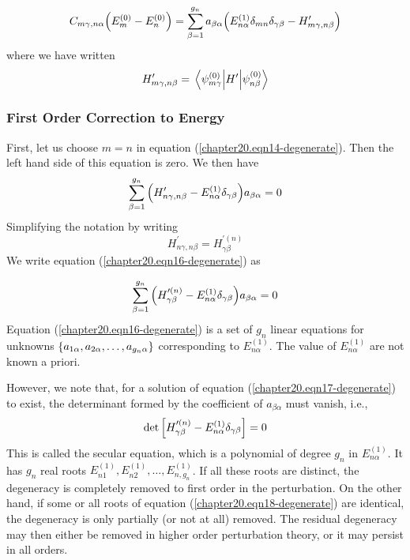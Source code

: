 	\begin{equation}
		C_{m\gamma, n\alpha} \qty(E_m^{(0)} - E_n^{(0)}) = \sum_{\beta=1}^{g_n} a_{\beta\alpha} \qty(E_{n\alpha}^{(1)}\delta_{mn}\delta_{\gamma\beta}  -  H^\prime_{m\gamma,n\beta})
		\label{chapter20.eqn14-degenerate}
	\end{equation}
	where we have written
	\begin{equation}
		H^\prime_{m\gamma,n\beta} = \matrixel{\psi_{m\gamma}^{(0)}} {H^\prime} {\psi_{n\beta}^{(0)}}
		\label{chapter20.eqn15-degenerate}
	\end{equation}
	
	\subsubsection{First Order Correction to Energy}
	
	First, let us choose $m=n$ in equation (\ref{chapter20.eqn14-degenerate}). Then the left hand side of this equation is zero. We then have
	\begin{equation}
		\sum_{\beta=1}^{g_n} \qty(H^\prime_{n\gamma,n \beta}  -  E_{n\alpha}^{(1)}\delta_{\gamma \beta}) a_{\beta \alpha} = 0
		\label{chapter20.eqn16-degenerate}
	\end{equation}
	Simplifying the notation by writing
	\begin{equation}
		H^\prime_{n\gamma, n\beta} = H^{\prime (n)}_{\gamma\beta}
	\end{equation}
	We write equation (\ref{chapter20.eqn16-degenerate}) as
	
	\begin{equation}
		\sum_{\beta=1}^{g_n} \qty(H^{\prime (n)}_{\gamma \beta}  -  E_{n\alpha}^{(1)}\delta_{\gamma \beta}) a_{\beta \alpha} = 0
		\label{chapter20.eqn17-degenerate}
	\end{equation}
	Equation (\ref{chapter20.eqn16-degenerate}) is a set of $g_n$ linear equations for unknowns $\qty{a_{1\alpha}, a_{2\alpha}, \ldots, a_{g_n \alpha}}$ corresponding to $E_{n\alpha}^{(1)}$. The value of $E_{n\alpha}^{(1)}$ are not known a priori.
		
		However, we note that, for a solution of equation (\ref{chapter20.eqn17-degenerate}) to exist, the determinant formed by the coefficient of $a_{\beta\alpha}$ must vanish, i.e.,
		\begin{equation}
			\det \qty[H^{\prime (n)}_{\gamma \beta}  -  E^{(1)}_{n\alpha} \delta_{\gamma \beta}] = 0
			\label{chapter20.eqn18-degenerate}
		\end{equation}
		This is called the secular equation, which is a polynomial of degree $g_n$ in $E_{n\alpha}^{(1)}$. It has $g_n$ real roots $E_{n 1}^{(1)}, E_{n 2}^{(1)}, \ldots, E_{n, g_n}^{(1)}$. If all these roots are distinct, the degeneracy is completely removed to first order in the perturbation. On the other hand, if some or all roots of equation (\ref{chapter20.eqn18-degenerate}) are identical, the degeneracy is only partially (or not at all) removed. The residual degeneracy may then either be removed in higher order perturbation theory, or it may persist in all orders.
		
